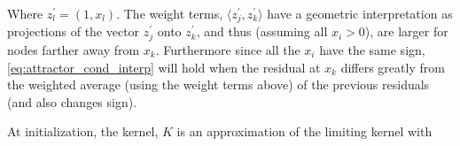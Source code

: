Where $z^\prime_l = (1, x_l)$. The weight terms, $\langle z^\prime_j, z^\prime_k \rangle$ have a geometric interpretation as projections of the vector $z^\prime_j$ onto $z^\prime_k$, and thus (assuming all $x_i > 0$), are larger for nodes farther away from $x_k$. Furthermore since all the $x_i$ have the same sign, \eqref{eq:attractor_cond_interp} will hold when the residual at $x_k$ differs greatly from the weighted average (using the weight terms above) of the previous residuals (and also changes sign). 

At initialization, the kernel, $K$ is an approximation of the limiting kernel with 
\fi